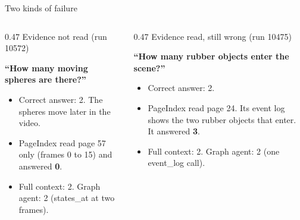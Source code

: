 \documentclass[aspectratio=169,11pt]{beamer}
\newcommand{\lbl}[1]{{\color{Mute}\fontsize{9.5}{12}\selectfont #1}\par}
\newcommand{\code}[1]{{\ttfamily\fontsize{8.6}{11.4}\selectfont #1}}
\begin{document}
\begin{frame}{Two kinds of failure}
  \vspace{0.20cm}
  \begin{columns}[T,onlytextwidth]
    \begin{column}{0.47\textwidth}
      \lbl{Evidence not read (run 10572)}
      {\color{Ink}\fontsize{11.5}{14.5}\selectfont\bfseries ``How many moving spheres are there?''\par}
      \vspace{0.12cm}
      {\fontsize{10}{13.5}\selectfont
      \begin{itemize}\setlength{\itemsep}{2pt}
        \item Correct answer: 2. The spheres move later in the video.
        \item PageIndex read page 57 only (frames 0 to 15) and answered \textbf{0}.
        \item Full context: 2. Graph agent: 2 (\code{states\_at} at two frames).
      \end{itemize}}
    \end{column}
    \begin{column}{0.47\textwidth}
      \lbl{Evidence read, still wrong (run 10475)}
      {\color{Ink}\fontsize{11.5}{14.5}\selectfont\bfseries ``How many rubber objects enter the scene?''\par}
      \vspace{0.12cm}
      {\fontsize{10}{13.5}\selectfont
      \begin{itemize}\setlength{\itemsep}{2pt}
        \item Correct answer: 2.
        \item PageIndex read page 24. Its event log shows the two rubber objects that enter. It answered \textbf{3}.
        \item Full context: 2. Graph agent: 2 (one \code{event\_log} call).
      \end{itemize}}
    \end{column}
  \end{columns}
\end{frame}
\end{document}
